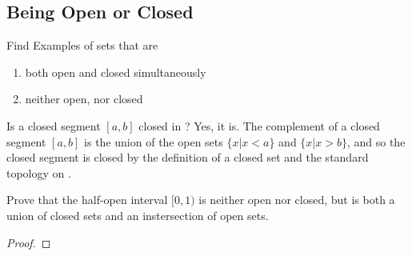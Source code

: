 \subsection{Being Open or Closed}
\begin{majorEx} %
  Find Examples of sets that are 
  \begin{enumerate}
  \item both open and closed simultaneously
  \item neither open, nor closed
  \end{enumerate}
\end{majorEx}

\begin{minorEx} %
\end{minorEx}

\begin{majorEx} %
Is a closed segment $[a, b]$ closed in ?
Yes, it is. The complement of a closed segment $[a, b]$ is the union of the open sets $\{x | x < a\}$ and $\{x | x > b\}$, and so the closed segment is closed by the definition of a closed set and the standard topology on .
\end{majorEx}

\begin{minorEx} %
  Prove that the half-open interval $[0,1)$  is neither open nor
  closed, but is both a union of closed sets and an instersection of
  open sets.
\end{minorEx}
\begin{proof}
\end{proof}

\begin{minorEx} %
\end{minorEx}
